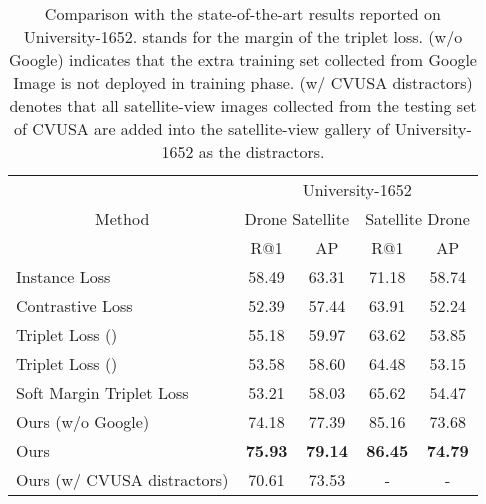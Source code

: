 \documentclass[journal]{IEEEtran}
\begin{document}
\par
\setlength{\tabcolsep}{0.8pt}
\begin{table}[htb]
\small
\caption{
Comparison with the state-of-the-art results reported on University-1652.  stands for the margin of the triplet loss. (w/o Google) indicates that the extra training set collected from Google Image is not deployed in training phase. (w/ CVUSA distractors) denotes that all satellite-view images collected from the testing set of CVUSA are added into the satellite-view gallery of University-1652 as the distractors.} 
\begin{center}
\begin{tabular}{l|cc|cc}
\hline
\multicolumn{1}{c|}{\multirow{3}{*}{Method}} & \multicolumn{4}{c}{University-1652} \\
\cline{2-5}
& \multicolumn{2}{c|}{Drone  Satellite} & \multicolumn{2}{c}{Satellite  Drone}\\
& R@1 & AP & R@1 & AP \\
\shline
Instance Loss~\cite{zheng_university-1652_nodate} & 58.49 & 63.31 & 71.18 & 58.74 \\
Contrastive Loss~\cite{lin_learning_2015} & 52.39 & 57.44 & 63.91 & 52.24 \\
Triplet Loss ()~\cite{chechik2009large} & 55.18 & 59.97 & 63.62 & 53.85 \\
Triplet Loss ()~\cite{chechik2009large} & 53.58 & 58.60 & 64.48 & 53.15 \\
Soft Margin Triplet Loss~\cite{hu_cvm-net_2018} & 53.21 & 58.03 & 65.62 & 54.47 \\
\hline
Ours (w/o Google) & 74.18 & 77.39 & 85.16 & 73.68 \\
Ours & \textbf{75.93} & \textbf{79.14} & \textbf{86.45} & \textbf{74.79} \\
Ours (w/ CVUSA distractors) & 70.61 & 73.53 & - & - \\
\hline
\end{tabular}
\end{center}
\label{table:university1652}
\end{table}
\end{document}

